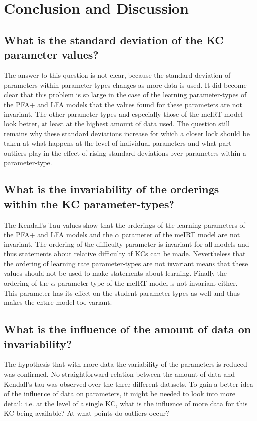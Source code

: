 \documentclass{scrartcl}
\newcommand\todo[1]{\textit{\textcolor{red}{#1}}}
\begin{document}

\section{Conclusion and Discussion}
\subsection{What is the standard deviation of the KC parameter values?}
The answer to this question is not clear, because the standard deviation of parameters within parameter-types changes as more data is used. It did become clear that this problem is so large in the case of the learning parameter-types of the PFA+ and LFA models that the values found for these parameters are not invariant. The other parameter-types and especially those of the meIRT model look better, at least at the highest amount of data used. The question still remains why these standard deviations increase for which a closer look should be taken at what happens at the level of individual parameters and what part outliers play in the effect of rising standard deviations over parameters within a parameter-type. 

\subsection{What is the invariability of the orderings within the KC parameter-types?}
The Kendall's Tau values show that the orderings of the learning parameters of the PFA+ and LFA models and the $\alpha$ parameter of the meIRT model are not invariant. The ordering of the difficulty parameter is invariant for all models and thus statements about relative difficulty of KCs can be made. Nevertheless that the ordering of learning rate parameter-types are not invariant means that these values should not be used to make statements about learning. Finally the ordering of the $\alpha$ parameter-type of the meIRT model is not invariant either. This parameter has its effect on the student parameter-types as well and thus makes the entire model too variant.  

\subsection{What is the influence of the amount of data on invariability?}
The hypothesis that with more data the variability of the parameters is reduced was confirmed. No straightforward relation between the amount of data and Kendall's tau was observed over the three different datasets. To gain a better idea of the influence of data on parameters, it might be needed to look into more detail: i.e. at the level of a single KC, what is the influence of more data for this KC being available? At what points do outliers occur? 
\end{document}

